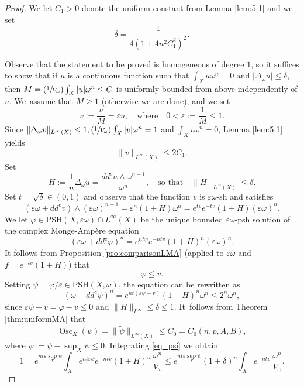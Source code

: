 \documentclass[11pt]{article}
\numberwithin{equation}{section}
\newcommand{\Psfrac}[2]{(\sfrac{#1}{#2})}
\DeclareMathOperator{\Osc}{Osc}
\theoremstyle{definition}
\let\e\varepsilon
\newcommand \PSH {\mathrm{PSH}}
\begin{document}
\begin{proof}
We let $C_1>0$ denote the uniform constant from Lemma \ref{lem:5.1} and we set
\[
\delta=\frac{1}{4(1+4n^2C_1^2)^{2}}.
\]

Observe that the statement to be proved is homogeneous of degree $1$, so it suffices to show that
if $u$ is a continuous function such that $\int_X u \omega^n=0$ and $|\Delta_{\omega} u| \leq \delta$,
then $M=\Psfrac{1}{V_\omega}\int_ X |u|\omega^n \leq C$ is uniformly bounded from above independently of $u$. We~assume that $M \geq 1$ (otherwise we are done), and we set
\[
v:=\frac{u}{M} =\varepsilon u,
\quad \text{where} \quad
0<\varepsilon:= \frac{1}{M}\leq 1.
\]
Since $\|\Delta_\omega v\|_{L^\infty(X)} \leq 1, \Psfrac{1}{V_\omega} \int_X |v|\omega^n=1$
and $\int_X v\omega^n=0$, Lemma \ref{lem:5.1} yields
\begin{equation}\label{eq_bound_v}
\|v\|_{L^\infty(X)} \leq 2C_1.
\end{equation}
Set
\[
H:=\frac{1}{n}\Delta_\omega u= \frac{dd^c u\wedge \omega^{n-1}}{\omega^n},
\quad \text{so that} \quad
\|H\|_{L^\infty(X)}\leq \delta.
\]
Set $t=\sqrt{\delta} \in (0,1)$ and observe that the function $v$ is $\varepsilon\omega$-sh
and satisfies
\[
(\varepsilon\omega+dd^c v)\wedge (\varepsilon\omega)^{n-1}=\varepsilon^n(1+H)\omega^n= e^{tv }e^{-tv}(1+H) (\varepsilon \omega)^n .
\]
We let $\varphi\in\PSH(X, \varepsilon \omega)\cap L^{\infty}(X)$ be the unique bounded
$\e\omega$-psh solution of the complex Monge-Ampère equation
\[
(\varepsilon \omega +dd^c \varphi )^n= e^{nt\varphi }e^{-ntv}(1+H)^n (\varepsilon \omega)^n.
\]
It follows from Proposition \ref{pro:comparisonLMA}
(applied to $\e \omega$ and $f=e^{-tv}(1+H)$) that
\begin{equation}\label{eq_phi_v}
\varphi\leq v.
\end{equation}
Setting $ \psi=\varphi/ \varepsilon \in\PSH(X, \omega)$, the equation can be rewritten as
\begin{equation}\label{eq_psi}
( \omega +dd^c \psi )^n= e^{nt(\varepsilon\psi-v )}(1+H)^n \omega^n \leq 2^n \omega^n,
\end{equation}
since $\varepsilon\psi-v=\varphi-v \leq 0$ and $\|H\|_{L^\infty}\leq \delta \leq 1$. It~follows from Theorem \ref{thm:uniformMA} that
\[
\Osc_X (\psi)= \|\tilde{\psi}\|_{L^\infty(X)}\leq C_0=C_0(n,p,A,B),
\]
where $\tilde{\psi}:=\psi-\sup_X \psi \leq 0$.
Integrating \eqref{eq_psi} we obtain
\[
1= e^{nt\varepsilon \sup_X \psi} \int_X e^{nt\varepsilon\tilde{\psi}}e^{-ntv}(1+H)^n\,\frac{\omega^n}{V_\omega}
\leq e^{nt\varepsilon \sup_X \psi}(1+\delta)^n\int_X e^{-ntv}\,\frac{\omega^n}{V_\omega}.
\]
\end{proof}
\end{document}

